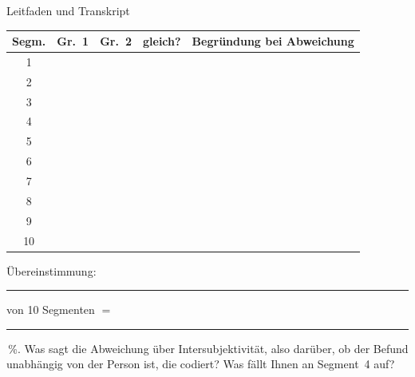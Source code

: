 \begin{uebungsblatt}{Leitfaden und Transkript}
\begin{center}
\small
\renewcommand{\arraystretch}{1.5}
\begin{tabular}{|c|p{}|p{}|p{}|p{}|}
\hline
\textbf{Segm.} & \textbf{Gr.~1} & \textbf{Gr.~2} & \textbf{gleich?} & \textbf{Begründung bei Abweichung} \\ \hline
1 & & & & \\ \hline
2 & & & & \\ \hline
3 & & & & \\ \hline
4 & & & & \\ \hline
5 & & & & \\ \hline
6 & & & & \\ \hline
7 & & & & \\ \hline
8 & & & & \\ \hline
9 & & & & \\ \hline
10 & & & & \\ \hline
\end{tabular}
\end{center}
Übereinstimmung: \rule{10mm}{0.3pt} von 10 Segmenten $=$
\rule{12mm}{0.3pt}\,\%. Was sagt die Abweichung über Intersubjektivität,
also darüber, ob der Befund unabhängig von der Person ist, die codiert?
Was fällt Ihnen an Segment~4 auf?
\end{uebungsblatt}

